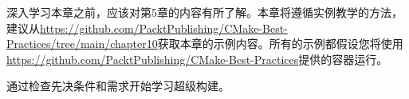 深入学习本章之前，应该对第5章的内容有所了解。本章将遵循实例教学的方法，建议从\url{https://github.com/PacktPublishing/CMake-Best-Practices/tree/main/chapter10}获取本章的示例内容。所有的示例都假设您将使用\url{https://github.com/PacktPublishing/CMake-Best-Practices}提供的容器运行。

通过检查先决条件和需求开始学习超级构建。